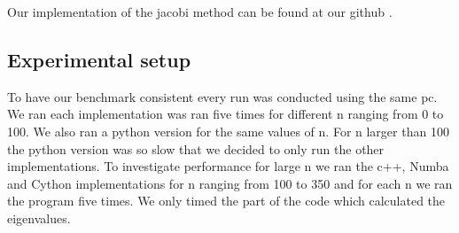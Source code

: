 Our implementation of the jacobi method can be found at our github \cite{github}.

\subsection*{Experimental setup}
To have our benchmark consistent every run was conducted using the same pc. We
ran each implementation was ran five times for different n ranging from 0 to
100. We also ran a python version for the same values of n. For n larger than
100 the python version was so slow that we decided to only run the other
implementations. To investigate performance for large n we ran the c++, Numba
and Cython implementations for n ranging from 100 to 350 and for each n we
ran the program five times. We only timed the part of the code which calculated
the eigenvalues.
